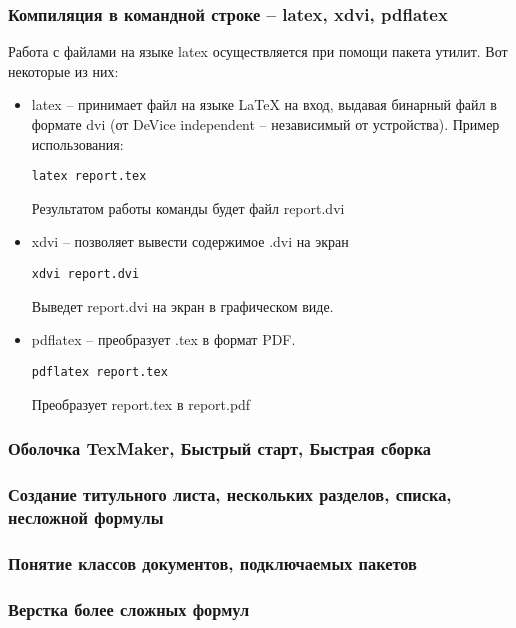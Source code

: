 \documentclass[12pt,a4paper]{article}
\begin{document}
\subsubsection{Компиляция в командной строке – latex, xdvi, pdflatex}
Работа с файлами на языке latex осуществляется при помощи пакета утилит. Вот некоторые из них:
\begin{itemize}
\item latex -- принимает файл на языке \LaTeX{} на вход, выдавая бинарный файл в формате dvi (от DeVice independent -- независимый от устройства). Пример использования:
\begin{Verbatim}[xleftmargin=.5in,fontsize=\small]
latex report.tex
\end{Verbatim}

Результатом работы команды будет файл report.dvi
\item xdvi -- позволяет вывести содержимое .dvi на экран
\begin{Verbatim}[xleftmargin=.5in,fontsize=\small]
xdvi report.dvi
\end{Verbatim}
Выведет report.dvi на экран в графическом виде.
\item pdflatex -- преобразует .tex в формат PDF.
\begin{Verbatim}[xleftmargin=.5in,fontsize=\small]
pdflatex report.tex
\end{Verbatim}
Преобразует report.tex в report.pdf
\end{itemize}
\subsubsection{Оболочка TexMaker, Быстрый старт, Быстрая сборка}
\subsubsection{Создание титульного листа, нескольких разделов, списка, несложной формулы}
\subsubsection{Понятие классов документов, подключаемых пакетов}
\subsubsection{Верстка более сложных формул}
\end{document}
